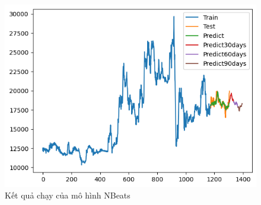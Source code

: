 \begin{figure}[H]
\begin{minipage}{0.15\textwidth}
    \includegraphics[width=1\textwidth]{resources/chapter-5/newdata1/result/EIB_NBeats_9-1.png}
    \end{minipage}
    \hfill
    
    \caption{Kết quả chạy của mô hình NBeats}
    \label{fig:N-BEATS}
\end{figure}

